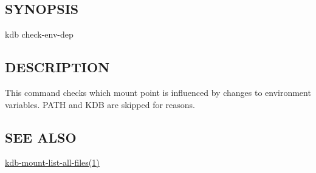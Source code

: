 \subsection*{S\+Y\+N\+O\+P\+S\+IS}

{\ttfamily kdb check-\/env-\/dep}

\subsection*{D\+E\+S\+C\+R\+I\+P\+T\+I\+ON}

This command checks which mount point is influenced by changes to environment variables. {\ttfamily P\+A\+TH} and {\ttfamily K\+DB} are skipped for reasons.

\subsection*{S\+EE A\+L\+SO}


\begin{DoxyItemize}
\item \hyperlink{doc_help_kdb-mount-list-all-files_md}{kdb-\/mount-\/list-\/all-\/files(1)} 
\end{DoxyItemize}